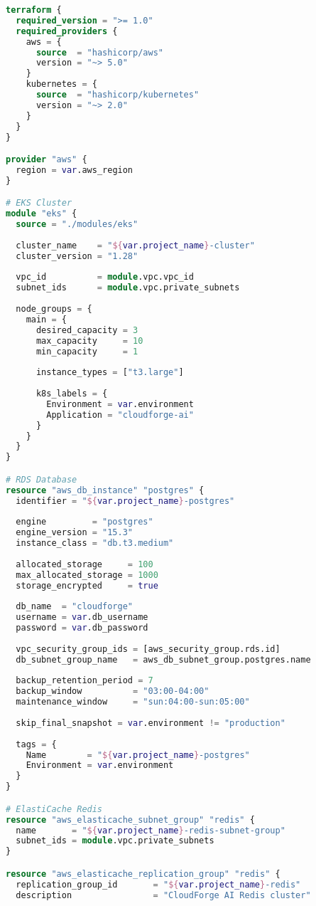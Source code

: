 \begin{lstlisting}[language=terraform]
terraform {
  required_version = ">= 1.0"
  required_providers {
    aws = {
      source  = "hashicorp/aws"
      version = "~> 5.0"
    }
    kubernetes = {
      source  = "hashicorp/kubernetes"
      version = "~> 2.0"
    }
  }
}

provider "aws" {
  region = var.aws_region
}

# EKS Cluster
module "eks" {
  source = "./modules/eks"
  
  cluster_name    = "${var.project_name}-cluster"
  cluster_version = "1.28"
  
  vpc_id          = module.vpc.vpc_id
  subnet_ids      = module.vpc.private_subnets
  
  node_groups = {
    main = {
      desired_capacity = 3
      max_capacity     = 10
      min_capacity     = 1
      
      instance_types = ["t3.large"]
      
      k8s_labels = {
        Environment = var.environment
        Application = "cloudforge-ai"
      }
    }
  }
}

# RDS Database
resource "aws_db_instance" "postgres" {
  identifier = "${var.project_name}-postgres"
  
  engine         = "postgres"
  engine_version = "15.3"
  instance_class = "db.t3.medium"
  
  allocated_storage     = 100
  max_allocated_storage = 1000
  storage_encrypted     = true
  
  db_name  = "cloudforge"
  username = var.db_username
  password = var.db_password
  
  vpc_security_group_ids = [aws_security_group.rds.id]
  db_subnet_group_name   = aws_db_subnet_group.postgres.name
  
  backup_retention_period = 7
  backup_window          = "03:00-04:00"
  maintenance_window     = "sun:04:00-sun:05:00"
  
  skip_final_snapshot = var.environment != "production"
  
  tags = {
    Name        = "${var.project_name}-postgres"
    Environment = var.environment
  }
}

# ElastiCache Redis
resource "aws_elasticache_subnet_group" "redis" {
  name       = "${var.project_name}-redis-subnet-group"
  subnet_ids = module.vpc.private_subnets
}

resource "aws_elasticache_replication_group" "redis" {
  replication_group_id       = "${var.project_name}-redis"
  description                = "CloudForge AI Redis cluster"
  

\end{lstlisting}
